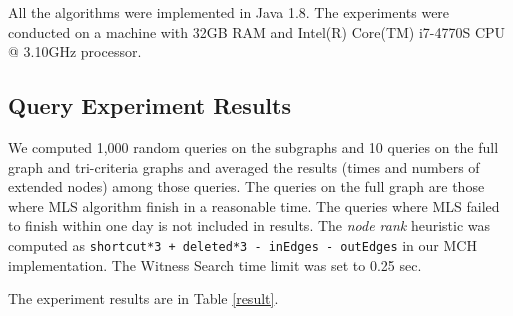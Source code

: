 
All the algorithms were implemented in Java 1.8. The experiments were conducted on a machine with 
32GB RAM and Intel(R) Core(TM) i7-4770S CPU @ 3.10GHz processor.


\subsection{Query Experiment Results}

We computed 1,000 random queries on the subgraphs and 10 queries on the full graph and tri-criteria graphs and averaged the results (times and numbers of extended nodes) among those queries. 
The queries on the full graph are those where MLS algorithm finish in a reasonable time. The queries where MLS failed to finish within one day is not included in results. 
The {\em node rank} heuristic was computed as {\tt shortcut*3 + deleted*3 -~inEdges -~outEdges} in our MCH implementation. The Witness Search time limit was set to 0.25 sec. 

The experiment results are in Table \ref{result}. 

